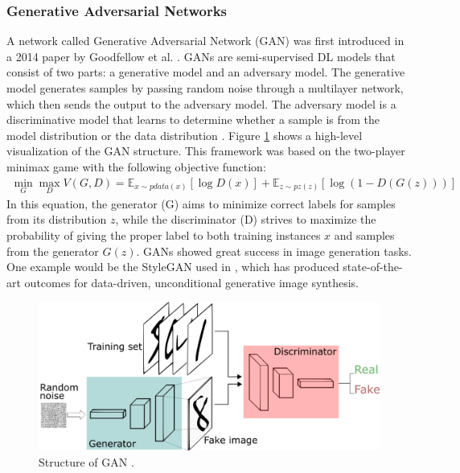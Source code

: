 \documentclass[12pt]{diazessay}
\begin{document}
    \subsubsection{Generative Adversarial Networks}
    \label{section: Generative Adversarial Networks}
    \hspace{0.7cm} A network called Generative Adversarial Network (GAN) was first introduced in a 2014 paper by Goodfellow et al. \cite{Goodfellow2014-cu}. GANs are semi-supervised DL models that consist of two parts: a generative model and an adversary model. The generative model generates samples by passing random noise through a multilayer network, which then sends the output to the adversary model. The adversary model is a discriminative model that learns to determine whether a sample is from the model distribution or the data distribution \cite{Goodfellow2014-cu}. Figure \ref{fig:GAN-Structure} shows a high-level visualization of the GAN structure. This framework was based on the two-player minimax game with the following objective function:
    \begin{equation*}
        \begin{aligned}
        \min_{G}\max_{D} V(G,D) = \mathbb{E}_{x\sim pdata(x)}[\log D(x)] + \mathbb{E}_{z\sim pz(z)}[\log (1-D(G(z)))]
        \end{aligned}
     \end{equation*}
   \hspace{0.7cm} In this equation, the generator (G) aims to minimize correct labels for samples from its distribution $z$, while the discriminator (D) strives to maximize the probability of giving the proper label to both training instances $x$ and samples from the generator $G(z)$. GANs showed great success in image generation tasks. One example would be the StyleGAN used in \cite{Karras2019-cc}, which has produced state-of-the-art outcomes for data-driven, unconditional generative image synthesis.
    \begin{figure}[H]
        \centering
        \includegraphics[scale=0.35]{Figures/GANs-structure.jpg}
        \caption[Structure of GAN]{Structure of GAN \cite{silva2017GANs}.}
        \label{fig:GAN-Structure}
    \end{figure}
\end{document}
